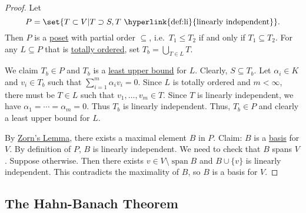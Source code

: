 \documentclass{article}
\DeclareMathOperator{\spn}{span}
\begin{document}
\begin{proof}
    Let
    \begin{equation*}P = \set{T \subset V | T \supset S, T \text{ \hyperlink{def:li}{linearly independent}}}.\end{equation*}
    Then $P$ is a \hyperlink{def:poset}{poset} with partial order $\subseteq$, i.e.\ $T_1 \leq T_2$ if and only if $T_1 \subseteq T_2$.
    For any $L \subseteq P$ that is \hyperlink{def:poset}{totally ordered}, set $T_b = \bigcup_{T \in L} T$.

    We claim $T_b \in P$ and $T_b$ is a \hyperlink{def:poset}{least upper bound} for $L$. Clearly, $S \subseteq T_b$.
    Let $\alpha_i \in K$ and $v_i \in T_b$ such that $\sum_{i=1}^m \alpha_i v_i = 0$.
    Since $L$ is totally ordered and $m < \infty$, there must be $T \in L$ such that $v_1, \dotsc, v_m \in T$.
    Since $T$ is linearly independent, we have $\alpha_1 = \dotsb = \alpha_m = 0$. Thus $T_b$ is linearly independent.
    Thus, $T_b \in P$ and clearly a least upper bound for $L$.

    By \hyperlink{lem:zorn}{Zorn's Lemma}, there exists a maximal element $B$ in $P$.
    Claim: $B$ is a \hyperlink{def:basis}{basis} for $V$. By definition of $P$, $B$ is linearly independent. We need to check that $B$ spans $V$.
    Suppose otherwise. Then there exists $v \in V \setminus \spn{B}$ and $B \cup \{v\}$ is linearly independent.
    This contradicts the maximality of $B$, so $B$ is a basis for $V$.
\end{proof}

\subsection{The Hahn-Banach Theorem}

\end{document}
